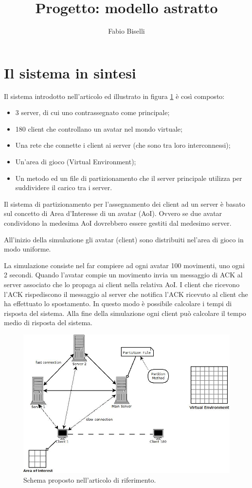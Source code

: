 \documentclass{article}
\author{Fabio Biselli}
\title{Progetto: modello astratto}
\date{}
\begin{document}
\maketitle

\section{Il sistema in sintesi}
Il sistema introdotto nell'articolo ed illustrato in figura \ref{fig1}
è così composto:
\begin{itemize}
\item
3 server, di cui uno contrassegnato come principale;
\item
180 client che controllano un avatar nel mondo virtuale;
\item
Una rete che connette i client ai server (che sono tra loro interconnessi);
\item
Un'area di gioco (Virtual Environment);
\item
Un metodo ed un file di partizionamento che il server principale utilizza per
suddividere il carico tra i server.
\end{itemize}

Il sistema di partizionamento per l'assegnamento dei client ad un server è
basato sul concetto di Area d'Interesse di un avatar (AoI). Ovvero se due
avatar condividono la medesima AoI dovrebbero essere gestiti dal medesimo
server.

All'inizio della simulazione gli avatar (client) sono distribuiti nel'area
di gioco in modo uniforme.  

La simulazione consiste nel far compiere ad ogni avatar 100 movimenti, uno
ogni 2 secondi. Quando l'avatar compie un movimento invia un messaggio di
ACK al server associato che lo propaga ai client nella relativa AoI.
I client che ricevono l'ACK rispediscono il messaggio al server che notifica
l'ACK ricevuto al client che ha effettuato lo spostamento. In questo modo è
possibile calcolare i tempi di risposta del sistema.
Alla fine della simulazione ogni client può calcolare il tempo medio di
risposta del sistema.

\begin{figure}
\label{fig1}
\begin{center}
\includegraphics[scale=0.50]{schema.jpeg}
\end{center}
\caption{Schema proposto nell'articolo di riferimento.}
\end{figure}
\end{document}
